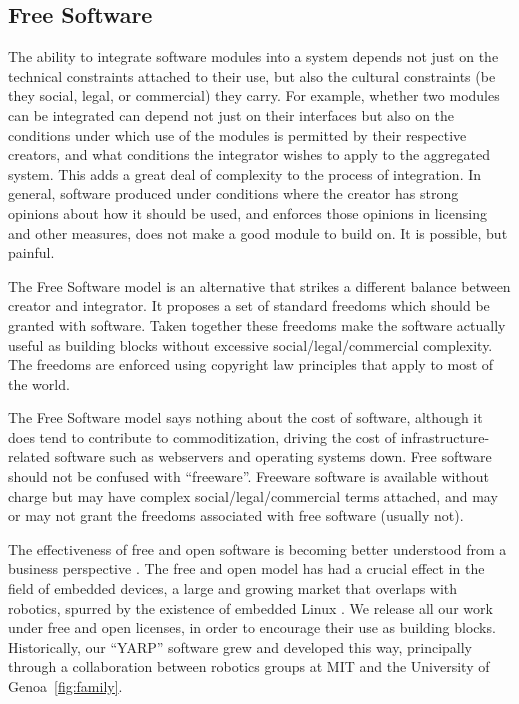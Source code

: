 \subsection{Free Software}

The ability to integrate software modules into a system
depends not just on the technical constraints attached
to their use, but also the cultural constraints
(be they social, legal, or commercial) they carry.
%
For example, whether two modules can be integrated
can depend not just on their interfaces but also on
the conditions under which use of the modules
is permitted by their respective creators,
and what conditions the integrator wishes to 
apply to the aggregated system.  
%
This adds a great deal of complexity to the process
of integration.
%
In general, software produced under conditions where the 
creator has strong opinions about how it should be 
used, and enforces those opinions in licensing
and other measures, does not make a good module 
to build on.
%
It is possible, but painful.

The Free Software model is an alternative that strikes a different
balance between creator and integrator.  It proposes a set of standard
freedoms which should be granted with software. Taken together 
these freedoms make
the software actually useful as building blocks without excessive
social/legal/commercial complexity.  The freedoms are enforced using
copyright law principles that apply to most of the world.

The Free Software model says nothing about the cost of software,
although it does tend to contribute to commoditization, driving the
cost of infrastructure-related software such as webservers and
operating systems down.  Free software should not be confused with
``freeware''.  Freeware software is available without charge but may
have complex social/legal/commercial terms attached, and may
or may not grant the freedoms associated with free software
(usually not).

The effectiveness of free and open software is 
becoming better understood from a business
perspective \cite{vonkrogh2006promise}.
%
The free and open model has had a crucial 
effect in the field of embedded devices,
a large and growing market that overlaps
with robotics, spurred by the existence
of embedded Linux \cite{henkel2006selective}.
%
We release all our work under free and open licenses, in order to
encourage their use as building blocks.  Historically, our ``YARP''
software grew and developed this way, principally through a
collaboration between robotics groups at MIT and the University of
Genoa~\ref{fig:family}.



